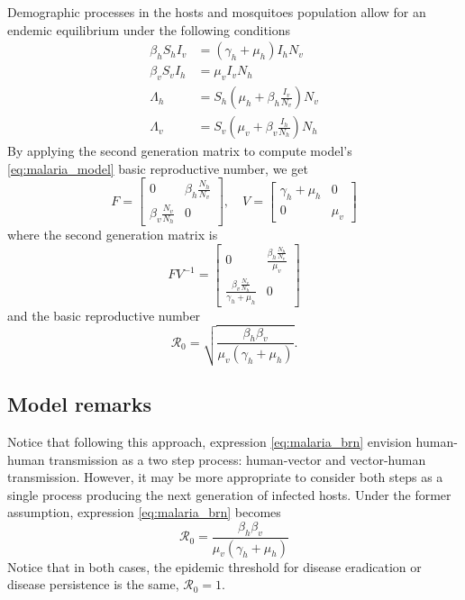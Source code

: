 \documentclass{book}\usepackage[]{graphicx}\usepackage[]{color}
\begin{document}
Demographic processes in the hosts and mosquitoes population allow for an endemic equilibrium under the following conditions
\begin{align}
\nonumber \beta_{h} S_{h} I_{v} &=\left(\gamma_{h}+\mu_{h}\right) I_{h} N_{v} \\
\nonumber \beta_{v} S_{v} I_{h} &=\mu_{v} I_{v}N_h \\
 \Lambda_{h} &=S_{h}\left(\mu_{h}+\beta_{h} \frac{I_{v}}{N_{v}}\right) N_{v} \\
\nonumber \Lambda_{v} &=S_{v}\left(\mu_{v}+\beta_{v} \frac{I_{h}}{N_{h}}\right)N_{h}
\end{align}
%
By applying the second generation matrix to compute model's \eqref{eq:malaria_model} basic reproductive number, we get
$$
F=\left[\begin{array}{cc}
0 & \beta_{h} \frac{N_{h}}{N_{v}} \\
\beta_{v} \frac{N_{v}}{N_{h}} & 0
\end{array}\right], \quad V=\left[\begin{array}{cc}
\gamma_{h}+\mu_{h} & 0 \\
0 & \mu_{v}
\end{array}\right]
$$
where the second generation matrix is
$$
F V^{-1}=\left[\begin{array}{cc}
0 & \frac{\beta_{h} \frac{N_{h}}{N_{v}}}{\mu_{v}} \\
\frac{\beta_{v} \frac{N_{v}}{N_{h}}}{\gamma_{h}+\mu_{h}} & 0
\end{array}\right]
$$
and the basic reproductive number
\begin{equation} \label{eq:malaria_brn}
\mathscr{R}_{0}=\sqrt{\frac{\beta_{h} \beta_{v}}{\mu_{v}\left(\gamma_{h}+\mu_{h}\right)}}.
\end{equation}

\subsection*{Model remarks}
Notice that following this approach, expression \eqref{eq:malaria_brn} envision human-human transmission as a two step process: human-vector and vector-human transmission. However, it may be more appropriate to consider both steps as a single process producing the next generation of infected hosts. Under the former assumption, expression \eqref{eq:malaria_brn} becomes
\begin{equation}
\mathscr{R}_{0}=\frac{\beta_{h} \beta_{v}}{\mu_{v}\left(\gamma_{h}+\mu_{h}\right)}
\end{equation}
%
Notice that in both cases, the epidemic threshold for disease eradication or disease persistence is the same, $\mathcal{R}_0=1$.
\end{document}
